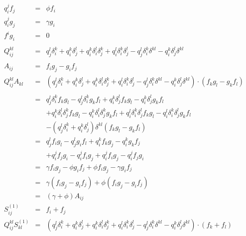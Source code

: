 \documentclass{article}
\begin{document}
\begin{eqnarray*}
  q_i^jf_j &=& \phi f_i\\
  q_i^jg_j &=& \gamma g_i\\
  f^ig_i &=& 0 \\
\\
  Q_{ij}^{kl} &=& 
        q_j^l\delta_i^k + 
        q_i^k\delta_j^l + 
        q_i^k\delta_i^l\delta_j^k +
        q_i^l\delta_i^k\delta_j^l - 
        q_j^l\delta_i^k\delta^{kl} - 
        q_i^k\delta_j^l\delta^{kl}\\
\\
  A_{ij} &=& f_ig_j - g_if_j
\\
  Q_{ij}^{kl}A_{kl} &=& 
                \left(  q_j^l\delta_i^k + 
                        q_i^k\delta_j^l + 
                        q_i^k\delta_i^l\delta_j^k +
                        q_i^l\delta_i^k\delta_j^l - 
                        q_j^l\delta_i^k\delta^{kl} -    
                        q_i^k\delta_j^l\delta^{kl}\right)
        \cdot  \left(f_kg_l - g_kf_l\right)\\
\\      
  &=& q_j^l\delta_i^kf_kg_l - q_j^l\delta_i^kg_kf_l + 
      q_i^k\delta_j^lf_kg_l - q_i^k\delta_j^lg_kf_l \\
      && + q_i^k\delta_i^l\delta_j^kf_kg_l - q_i^k\delta_i^l\delta_j^kg_kf_l + 
      q_i^l\delta_i^k\delta_j^lf_kg_l - q_i^l\delta_i^k\delta_j^lg_kf_l \\
      && - \left(q_j^l\delta_i^k + q_i^k\delta_j^l\right) \delta^{kl}
      \left(f_kg_l - g_kf_l\right)\\
  &=& q_j^lf_ig_l - q_j^lg_if_l + q_i^kf_kg_j - q_i^kg_kf_j \\
      && + q_i^jf_jg_i - q_i^jf_ig_j + q_i^jf_ig_j - q_i^jf_jg_i \\
  &=& \gamma f_ig_j - \phi g_if_j + \phi f_ig_j - \gamma g_if_j \\
  &=& \gamma (f_ig_j - g_if_j) + \phi (f_ig_j - g_if_j) \\ 
  &=& \left(\gamma + \phi\right)A_{ij}
\\
  S_{ij}^{(1)} &=& f_i + f_j
\\
  Q_{ij}^{kl}S_{kl}^{(1)} &=& 
                \left(  q_j^l\delta_i^k + 
                        q_i^k\delta_j^l + 
                        q_i^k\delta_i^l\delta_j^k +
                        q_i^l\delta_i^k\delta_j^l - 
                        q_j^l\delta_i^k\delta^{kl} -    
                        q_i^k\delta_j^l\delta^{kl}\right)
        \cdot  \left(f_k + f_l\right)\\

\end{eqnarray*}
\end{document}
